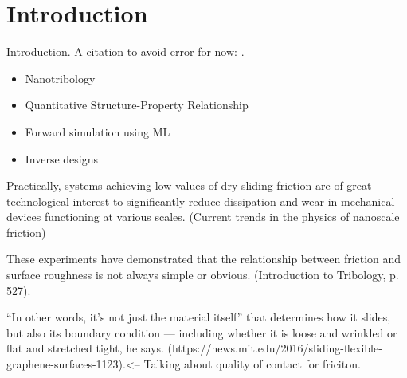 \chapter*{Introduction}
Introduction. A citation to avoid error for now: \cite{li_evolving_2016}.

\begin{itemize}
    \item Nanotribology
    \item Quantitative Structure-Property Relationship
    \item Forward simulation using ML
    \item Inverse designs
\end{itemize}


Practically, systems achieving low values of dry sliding friction are of great technological interest to significantly reduce dissipation and wear in mechanical devices functioning at various scales. (Current trends in the physics of nanoscale friction)

These experiments have demonstrated that the relationship between friction and surface roughness is not always simple or obvious. (Introduction to Tribology, p. 527).


“In other words, it’s not just the material itself” that determines how it slides, but also its boundary condition — including whether it is loose and wrinkled or flat and stretched tight, he says. (https://news.mit.edu/2016/sliding-flexible-graphene-surfaces-1123).<-- Talking about quality of contact for friciton.